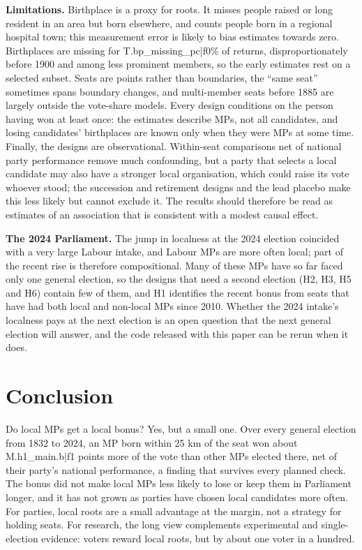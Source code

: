 \documentclass[11pt,a4paper]{article}
\begin{document}
\textbf{Limitations.} Birthplace is a proxy for roots. It misses people raised or long resident in an area but born elsewhere, and counts people born in a regional hospital town; this measurement error is likely to bias estimates towards zero. Birthplaces are missing for {{T.bp_missing_pc|f0}}\% of returns, disproportionately before 1900 and among less prominent members, so the early estimates rest on a selected subset. Seats are points rather than boundaries, the ``same seat'' sometimes spans boundary changes, and multi-member seats before 1885 are largely outside the vote-share models. Every design conditions on the person having won at least once: the estimates describe MPs, not all candidates, and losing candidates' birthplaces are known only when they were MPs at some time. Finally, the designs are observational. Within-seat comparisons net of national party performance remove much confounding, but a party that selects a local candidate may also have a stronger local organisation, which could raise its vote whoever stood; the succession and retirement designs and the lead placebo make this less likely but cannot exclude it. The results should therefore be read as estimates of an association that is consistent with a modest causal effect.

\textbf{The 2024 Parliament.} The jump in localness at the 2024 election coincided with a very large Labour intake, and Labour MPs are more often local; part of the recent rise is therefore compositional. Many of these MPs have so far faced only one general election, so the designs that need a second election (H2, H3, H5 and H6) contain few of them, and H1 identifies the recent bonus from seats that have had both local and non-local MPs since 2010. Whether the 2024 intake's localness pays at the next election is an open question that the next general election will answer, and the code released with this paper can be rerun when it does.

\section{Conclusion}
Do local MPs get a local bonus? Yes, but a small one. Over every general election from 1832 to 2024, an MP born within 25 km of the seat won about {{M.h1_main.b|f1}} points more of the vote than other MPs elected there, net of their party's national performance, a finding that survives every planned check. The bonus did not make local MPs less likely to lose or keep them in Parliament longer, and it has not grown as parties have chosen local candidates more often. For parties, local roots are a small advantage at the margin, not a strategy for holding seats. For research, the long view complements experimental and single-election evidence: voters reward local roots, but by about one voter in a hundred.
\end{document}
